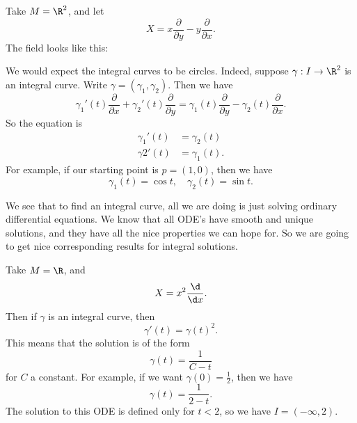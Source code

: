 \documentclass[a4paper]{article}
\begin{document}
\begin{eg}
  Take $M = \R^2$, and let
  \[
    X = x \frac{\partial}{\partial y} - y \frac{\partial}{\partial x}.
  \]
  The field looks like this:
  \begin{center}
  \end{center}
  We would expect the integral curves to be circles. Indeed, suppose $\gamma: I \to \R^2$ is an integral curve. Write $\gamma = (\gamma_1, \gamma_2)$. Then we have
  \[
    \gamma_1'(t) \frac{\partial}{\partial x} + \gamma_2'(t) \frac{\partial}{\partial y} = \gamma_1(t) \frac{\partial}{\partial y} - \gamma_2(t) \frac{\partial}{\partial x}.
  \]
  So the equation is
  \begin{align*}
    \gamma_1'(t) &= \gamma_2(t)\\
    \gamma2'(t) &= \gamma_1(t).
  \end{align*}
  For example, if our starting point is $p = (1, 0)$, then we have
  \[
    \gamma_1(t) = \cos t,\quad \gamma_2(t) = \sin t.
  \]
\end{eg}
We see that to find an integral curve, all we are doing is just solving ordinary differential equations. We know that all ODE's have smooth and unique solutions, and they have all the nice properties we can hope for. So we are going to get nice corresponding results for integral solutions.

\begin{eg}
  Take $M = \R$, and
  \[
    X = x^2 \frac{\d}{\d x}.
  \]
  Then if $\gamma$ is an integral curve, then
  \[
    \gamma'(t) = \gamma(t)^2.
  \]
  This means that the solution is of the form
  \[
    \gamma(t) = \frac{1}{C - t}
  \]
  for $C$ a constant. For example, if we want $\gamma(0) = \frac{1}{2}$, then we have
  \[
    \gamma(t) = \frac{1}{2 - t}.
  \]
  The solution to this ODE is defined only for $t < 2$, so we have $I = (-\infty, 2)$.
\end{eg}
\end{document}
